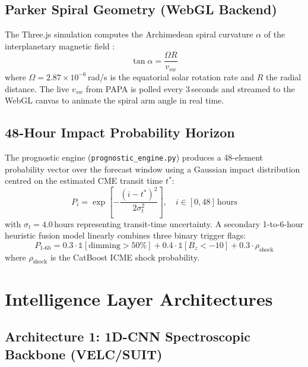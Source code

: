 \documentclass[conference,10pt,twocolumn]{IEEEtran}
\begin{document}
\subsection{Parker Spiral Geometry (WebGL Backend)}
The Three.js simulation computes the Archimedean spiral curvature $\alpha$ of the interplanetary magnetic field \cite{b8}:
\begin{equation}
\tan\alpha = \frac{\Omega R}{v_{sw}}
\label{eq:parker}
\end{equation}
where $\Omega = 2.87\times10^{-6}$\,rad/s is the equatorial solar rotation rate and $R$ the radial distance. The live $v_{sw}$ from PAPA is polled every 3\,seconds and streamed to the WebGL canvas to animate the spiral arm angle in real time.

\subsection{48-Hour Impact Probability Horizon}
The prognostic engine (\texttt{prognostic\_engine.py}) produces a 48-element probability vector over the forecast window using a Gaussian impact distribution centred on the estimated CME transit time $t^*$:
\begin{equation}
P_i = \exp\!\left[-\frac{(i - t^*)^2}{2\sigma_t^2}\right], \quad i \in [0, 48]\,\text{hours}
\label{eq:gauss_prob}
\end{equation}
with $\sigma_t = 4.0$\,hours representing transit-time uncertainty. A secondary 1-to-6-hour heuristic fusion model linearly combines three binary trigger flags:
\begin{equation}
P_{1\text{-}6h} = 0.3 \cdot \mathbb{1}[\text{dimming} > 50\%] + 0.4 \cdot \mathbb{1}[B_z < -10] + 0.3 \cdot \rho_{\text{shock}}
\label{eq:short_term}
\end{equation}
where $\rho_{\text{shock}}$ is the CatBoost ICME shock probability.

\section{Intelligence Layer Architectures}

\subsection{Architecture 1: 1D-CNN Spectroscopic Backbone (VELC/SUIT)}
\end{document}
